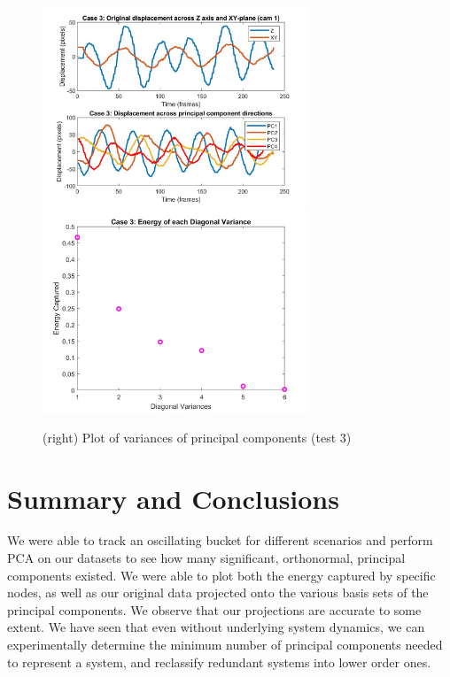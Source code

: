 \documentclass{article}
\begin{document}
\begin{figure}[H]
\begin{center}
\includegraphics[width = 8cm]{oscmotion3}
\includegraphics[width = 8cm]{energy3}
\caption{\label{fig:scaled_diss} (left) Plots of original z displacement vs new basis (test 3) }
\caption{\label{fig:scaled_diss} (right) Plot of variances of principal components (test 3)}
\end{center}
\end{figure}


\section*{\fontsize{19}{15}\selectfont Summary and Conclusions}
We were able to track an oscillating bucket for different scenarios and perform PCA on our datasets to see how many significant, orthonormal, principal components existed. We were able to plot both the energy captured by specific nodes, as well as our original data projected onto the various basis sets of the principal components. We observe that our projections are accurate to some extent. We have seen that even without underlying system dynamics, we can experimentally determine the minimum number of principal components needed to represent a system, and reclassify redundant systems into lower order ones.

\pagebreak
\end{document}

